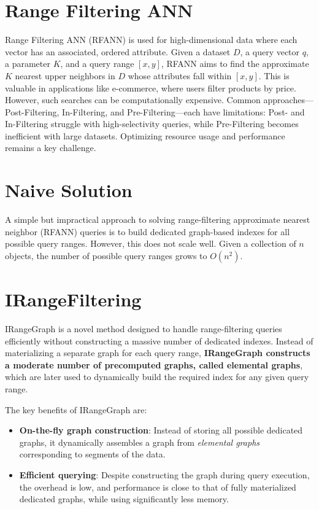 \section{Range Filtering ANN}
Range Filtering ANN (RFANN) is used for high-dimensional data where each vector has an associated, ordered attribute. Given a dataset \( D \), a query vector \( q \), a parameter \( K \), and a query range \([x, y]\), RFANN aims to find the approximate \( K \) nearest upper neighbors in \( D \) whose attributes fall within \([x, y]\). This is valuable in applications like e-commerce, where users filter products by price. However, such searches can be computationally expensive. Common approaches—Post-Filtering, In-Filtering, and Pre-Filtering—each have limitations: Post- and In-Filtering struggle with high-selectivity queries, while Pre-Filtering becomes inefficient with large datasets. Optimizing resource usage and performance remains a key challenge.


\section{Naive Solution}
A simple but impractical approach to solving range-filtering approximate nearest neighbor (RFANN) queries is to build dedicated graph-based indexes for all possible query ranges. However, this does not scale well. Given a collection of $n$ objects, the number of possible query ranges grows to $O(n^2)$. 

\section{IRangeFiltering}
IRangeGraph is a novel method designed to handle range-filtering queries efficiently without constructing a massive number of dedicated indexes. Instead of materializing a separate graph for each query range, \textbf{IRangeGraph constructs a moderate number of precomputed graphs, called elemental graphs}, which are later used to dynamically build the required index for any given query range.

The key benefits of IRangeGraph are:
\begin{itemize}
    \item \textbf{On-the-fly graph construction}: Instead of storing all possible dedicated graphs, it dynamically assembles a graph from \textit{elemental graphs} corresponding to segments of the data.
    \item \textbf{Efficient querying}: Despite constructing the graph during query execution, the overhead is low, and performance is close to that of fully materialized dedicated graphs, while using significantly less memory.
\end{itemize}


